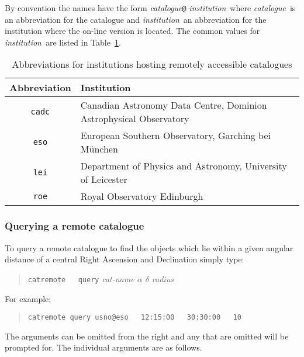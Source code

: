 \documentclass[twoside,11pt]{article}
\renewcommand{\_}{\texttt{\symbol{95}}}
\begin{document}
By convention the names have the form {\it catalogue}{\tt @}{\it
institution}\, where {\it catalogue}\, is an abbreviation for the
catalogue and {\it institution}\, an abbreviation for the institution
where the on-line version is located.  The common values for {\it
institution}\, are listed in Table~\ref{REMINST}.

\begin{table}[htbp]

\begin{center}
\begin{tabular}{cl}
Abbreviation  &  Institution  \\ \hline
{\tt cadc} & Canadian Astronomy Data Centre, Dominion Astrophysical
    Observatory  \\
{\tt eso} &  European Southern Observatory, Garching bei M\"{u}nchen \\
{\tt lei} &  Department of Physics and Astronomy, University of Leicester \\
{\tt roe} &  Royal Observatory Edinburgh \\
\end{tabular}
\end{center}

\caption{Abbreviations for institutions hosting remotely accessible
catalogues  \label{REMINST} }

\end{table}

\subsubsection{Querying a remote catalogue}

To query a remote catalogue to find the objects which lie within a given
angular distance of a central Right Ascension and Declination simply type:


\begin{verse}
{\tt catremote ~ query} {\it cat-name $\alpha$ $\delta$ radius}
\end{verse}

For example:

\begin{verse}
{\tt catremote query usno@eso ~ 12:15:00 ~ 30:30:00 ~ 10}
\end{verse}

The arguments can be omitted from the right and any that are omitted will
be prompted for.  The individual arguments are as follows.
\end{document}
